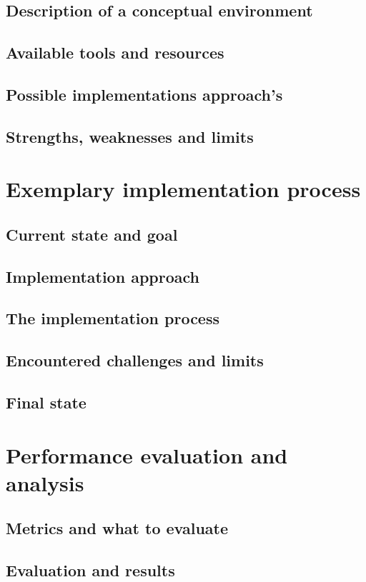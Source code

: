 \documentclass[12pt, a4paper]{article}
\begin{document}
    \subsection{Description of a conceptual environment}
    \subsection{Available tools and resources}
    \subsection{Possible implementations approach's}
    \subsection{Strengths, weaknesses and limits}
\section{Exemplary implementation process}
    \subsection{Current state and goal}
    \subsection{Implementation approach}
    \subsection{The implementation process}
    \subsection{Encountered challenges and limits}
    \subsection{Final state}
\section{Performance evaluation and analysis}
    \subsection{Metrics and what to evaluate}
    \subsection{Evaluation and results}
\end{document}
